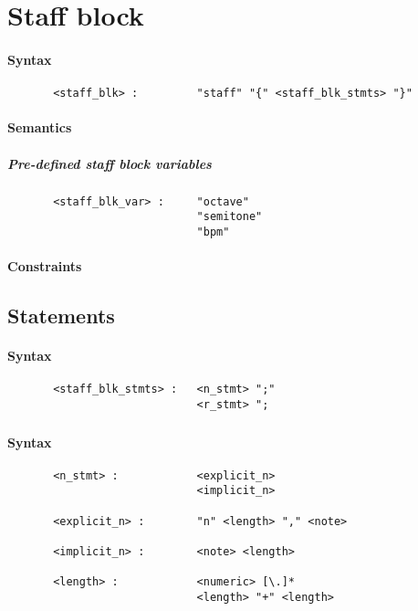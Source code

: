 \section{Staff block}
\paragraph{Syntax}
\begin{verbatim}
       <staff_blk> :         "staff" "{" <staff_blk_stmts> "}"
\end{verbatim}
\paragraph{Semantics}

\subparagraph{Pre-defined staff block variables }
\begin{verbatim}
       <staff_blk_var> :     "octave"
                             "semitone"
                             "bpm"
\end{verbatim}

\paragraph{Constraints}

\subsection{Statements }
\paragraph{Syntax}
\begin{verbatim}
       <staff_blk_stmts> :   <n_stmt> ";"
                             <r_stmt> ";
\end{verbatim}

\subsubsection{ }
\paragraph{Syntax}
\begin{verbatim}
       <n_stmt> :            <explicit_n>
                             <implicit_n>
 
       <explicit_n> :        "n" <length> "," <note>

       <implicit_n> :        <note> <length>

       <length> :            <numeric> [\.]*
                             <length> "+" <length>
\end{verbatim}

